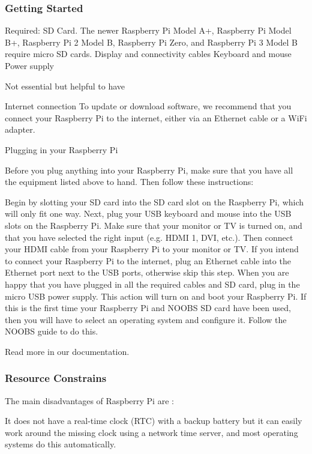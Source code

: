 \subsubsection{Getting Started}

Required:
SD Card. The newer Raspberry Pi Model A+, Raspberry Pi Model B+, Raspberry Pi 2 Model B, Raspberry Pi Zero, and Raspberry Pi 3 Model B require micro SD cards.
Display and connectivity cables
Keyboard and mouse
Power supply

Not essential but helpful to have

    Internet connection
        To update or download software, we recommend that you connect your Raspberry Pi to the internet, either via an Ethernet cable or a WiFi adapter.


Plugging in your Raspberry Pi

Before you plug anything into your Raspberry Pi, make sure that you have all the equipment listed above to hand. Then follow these instructions:

    Begin by slotting your SD card into the SD card slot on the Raspberry Pi, which will only fit one way.
    Next, plug your USB keyboard and mouse into the USB slots on the Raspberry Pi.
    Make sure that your monitor or TV is turned on, and that you have selected the right input (e.g. HDMI 1, DVI, etc.).
    Then connect your HDMI cable from your Raspberry Pi to your monitor or TV.
    If you intend to connect your Raspberry Pi to the internet, plug an Ethernet cable into the Ethernet port next to the USB ports, otherwise skip this step.
    When you are happy that you have plugged in all the required cables and SD card, plug in the micro USB power supply. This action will turn on and boot your Raspberry Pi.
    If this is the first time your Raspberry Pi and NOOBS SD card have been used, then you will have to select an operating system and configure it. Follow the NOOBS guide to do this.

Read more in our documentation.

\subsubsection{Resource Constrains}

The main disadvantages of Raspberry Pi are \cite{vujovic2014raspberry}:

It does not have a real-time clock (RTC) with a backup battery but it can easily work around the missing clock using a network time server, and most operating systems do this automatically.

